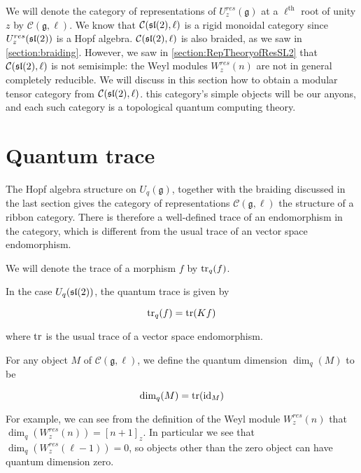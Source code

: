 We will denote the category of representations of $U_z^{res}(\mathfrak{g})$ at
a $\ell^\text{th}$ root of unity $z$ by $\mathcal{C}(\mathfrak{g}, \ell)$. We
know that $\mathcal{C}(\mathfrak{sl}(2), \ell)$ is a rigid monoidal category since
$U_z^{res}(\mathfrak{sl}(2))$ is a Hopf algebra. $\mathcal{C}(\mathfrak{sl}(2), \ell)$ is also
braided, as we saw in \ref{section:braiding}. However, we saw in
\ref{section:RepTheoryofResSL2} that $\mathcal{C}(\mathfrak{sl}(2), \ell)$ is not
semisimple: the Weyl modules $W_z^{res}(n)$ are not in general completely
reducible.   We will discuss in this section how to obtain a modular tensor
category from $\mathcal{C}(\mathfrak{sl}(2), \ell)$. this category's simple objects will
be our anyons, and each such category is a topological quantum computing
theory.



\section{Quantum trace}

The Hopf algebra structure on $U_q(\mathfrak{g})$, together with the braiding
discussed in the last section gives the category of representations
$\mathcal{C}(\mathfrak{g}, \ell)$ the structure of a ribbon category. There is
therefore a well-defined trace of an endomorphism in the category, which is
different from the usual trace of an vector space endomorphism. 

We will denote the trace of a morphism $f$ by $\operatorname{tr}_q(f)$.

In the case $U_q(\mathfrak{sl}(2))$, the quantum trace is given by 

\begin{equation}
    \operatorname{tr}_q(f) = \operatorname{tr}(Kf)
\end{equation}

where $\operatorname{tr}$ is the usual trace of a vector space endomorphism.

For any object $M$ of $\mathcal{C}(\mathfrak{g}, \ell)$, we define the quantum dimension $\dim_q(M)$ to be 

\begin{equation}
    \dim_q(M) = \operatorname{tr}(\operatorname{id}_M)
\end{equation}

For example, we can see from the definition of the Weyl module $W_z^{res}(n)$
that $\dim_q(W_z^{res}(n)) = [n+1]_z$. In particular we see that
$\dim_q(W_z^{res}(\ell - 1)) = 0$, so objects other than the zero object can
have quantum dimension zero. 

